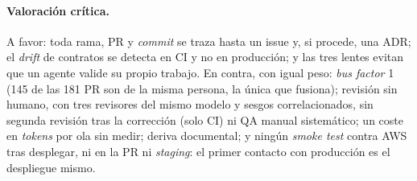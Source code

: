 \paragraph{Valoración crítica.} A favor: toda rama, PR y \emph{commit} se traza hasta un issue y,
si procede, una ADR; el \emph{drift} de contratos se detecta en CI y no en producción; y las tres
lentes evitan que un agente valide su propio trabajo. En contra, con igual peso: \emph{bus factor}
1 (145 de las 181 PR son de la misma persona, la única que fusiona); revisión sin humano, con tres
revisores del mismo modelo y sesgos correlacionados, sin segunda revisión tras la corrección (solo
CI) ni QA manual sistemático; un coste en \emph{tokens} por ola sin medir; deriva documental; y
ningún \emph{smoke test} contra AWS tras desplegar, ni  en la PR ni \emph{staging}: el
primer contacto con producción es el despliegue mismo.
